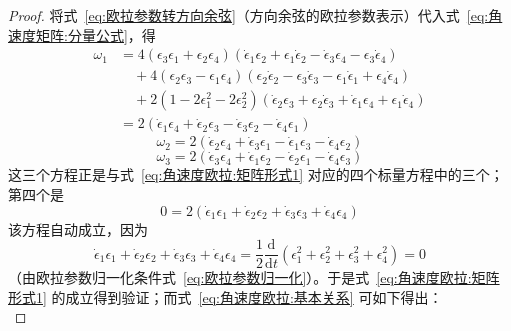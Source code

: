 \begin{proof}
    将式~\eqref{eq:欧拉参数转方向余弦}（方向余弦的欧拉参数表示）代入式~\eqref{eq:角速度矩阵:分量公式}，得
\begin{equation}
    \begin{aligned}
        \omega_1 &= 4(\epsilon_3\epsilon_1+\epsilon_2\epsilon_4)(\dot{\epsilon}_1\epsilon_2+\epsilon_1\dot{\epsilon}_2-\dot{\epsilon}_3\epsilon_4-\epsilon_3\dot{\epsilon}_4)\\
        &\quad + 4(\epsilon_2\epsilon_3-\epsilon_1\epsilon_4)(\epsilon_2\dot{\epsilon}_2-\epsilon_3\dot{\epsilon}_3-\epsilon_1\dot{\epsilon}_1+\epsilon_4\dot{\epsilon}_4)\\
        &\quad + 2(1-2\epsilon_1^2-2\epsilon_2^2)(\dot{\epsilon}_2\epsilon_3+\epsilon_2\dot{\epsilon}_3+\dot{\epsilon}_1\epsilon_4+\epsilon_1\dot{\epsilon}_4)\\
        &= 2(\dot{\epsilon}_1\epsilon_4+\dot{\epsilon}_2\epsilon_3-\dot{\epsilon}_3\epsilon_2-\dot{\epsilon}_4\epsilon_1)
    \end{aligned}
    \label{eq:角速度欧拉:omega1推导}
\end{equation}
\begin{equation}
    \omega_2 = 2(\dot{\epsilon}_2\epsilon_4+\dot{\epsilon}_3\epsilon_1-\dot{\epsilon}_1\epsilon_3-\dot{\epsilon}_4\epsilon_2)
    \label{eq:角速度欧拉:omega2推导}
\end{equation}
\begin{equation}
    \omega_3 = 2(\dot{\epsilon}_3\epsilon_4+\dot{\epsilon}_1\epsilon_2-\dot{\epsilon}_2\epsilon_1-\dot{\epsilon}_4\epsilon_3)
    \label{eq:角速度欧拉:omega3推导}
\end{equation}
这三个方程正是与式~\eqref{eq:角速度欧拉:矩阵形式1} 对应的四个标量方程中的三个；第四个是
\begin{equation}
    0 = 2(\dot{\epsilon}_1\epsilon_1+\dot{\epsilon}_2\epsilon_2+\dot{\epsilon}_3\epsilon_3+\dot{\epsilon}_4\epsilon_4)
    \label{eq:角速度欧拉:第四方程}
\end{equation}
该方程自动成立，因为
\begin{equation}
    \dot{\epsilon}_1\epsilon_1+\dot{\epsilon}_2\epsilon_2+\dot{\epsilon}_3\epsilon_3+\dot{\epsilon}_4\epsilon_4
    = \frac{1}{2}\frac{\mathrm{d}}{\mathrm{d}t}(\epsilon_1^2+\epsilon_2^2+\epsilon_3^2+\epsilon_4^2)=0
\end{equation}
（由欧拉参数归一化条件式~\eqref{eq:欧拉参数归一化}）。于是式~\eqref{eq:角速度欧拉:矩阵形式1} 的成立得到验证；而式~\eqref{eq:角速度欧拉:基本关系} 可如下得出：
\begin{equation}

\end{equation}
\end{proof}
